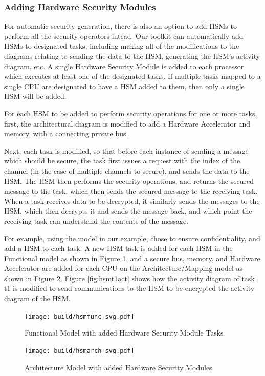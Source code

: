\documentclass[12pt]{article}
\begin{document}
\subsubsection{Adding Hardware Security Modules} 

For automatic security generation, there is also an option to add HSMs to perform all the security operators intead. 
Our toolkit can automatically add
HSMs to designated tasks, including making all of the modifications to the
diagrams relating to sending the data to the HSM, generating the HSM's activity
diagram, etc. A single Hardware Security Module is added to each processor which executes at least one of the designated tasks. If multiple tasks mapped to a single CPU are designated to have a HSM added to them, then only a single HSM will be added.

For each HSM to be added to perform security operations for one or more tasks, first, the architectural diagram is modified to add a Hardware Accelerator and memory, with a connecting private bus.

Next, each task is modified, so that before each instance of sending a message which should be secure, the task first issues a request with the index of the channel (in the case of multiple channels to secure), and sends the data to the HSM. The HSM then performs the security operations, and returns the secured message to the task, which then sends the secured message to the receiving task. When a task receives data to be decrypted, it similarly sends the messages to the HSM, which then decrypts it and sends the message back, and which point the receiving task can understand the contents of the message.

For example, using the model in our example, chose to ensure confidentiality, and add a HSM to each task. A new HSM task is added for each HSM in the Functional model as shown in Figure \ref{fig:hsmfunc}, and a secure bus, memory, and Hardware Accelerator are added for each CPU on the Architecture/Mapping model as shown in Figure \ref{fig:hsmarch}. Figure \ref{fig:hsmt1act} shows how the activity diagram of task t1 is modified to send communications to the HSM to be encrypted the activity diagram of the HSM. 

\begin{figure}[htbp]
\centering
\texttt{[image: build/hsmfunc-svg.pdf]}
\caption{Functional Model with added Hardware Security Module Tasks} \label{fig:hsmfunc}
\end{figure}


\begin{figure}[htbp]
\centering
\texttt{[image: build/hsmarch-svg.pdf]}
\caption{Architecture Model with added Hardware Security Modules} \label{fig:hsmarch}
\end{figure}
\end{document}
